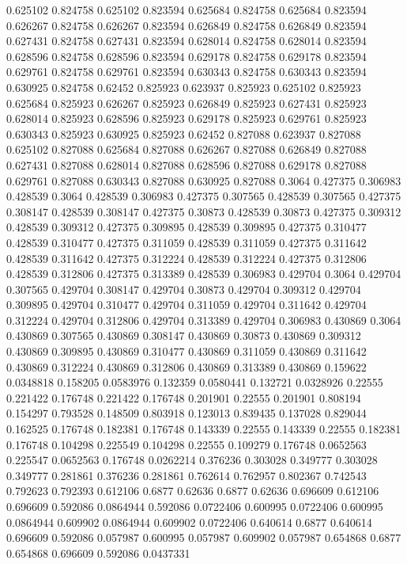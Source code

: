 0.625102 0.824758
0.625102 0.823594
0.625684 0.824758
0.625684 0.823594
0.626267 0.824758
0.626267 0.823594
0.626849 0.824758
0.626849 0.823594
0.627431 0.824758
0.627431 0.823594
0.628014 0.824758
0.628014 0.823594
0.628596 0.824758
0.628596 0.823594
0.629178 0.824758
0.629178 0.823594
0.629761 0.824758
0.629761 0.823594
0.630343 0.824758
0.630343 0.823594
0.630925 0.824758
0.62452 0.825923
0.623937 0.825923
0.625102 0.825923
0.625684 0.825923
0.626267 0.825923
0.626849 0.825923
0.627431 0.825923
0.628014 0.825923
0.628596 0.825923
0.629178 0.825923
0.629761 0.825923
0.630343 0.825923
0.630925 0.825923
0.62452 0.827088
0.623937 0.827088
0.625102 0.827088
0.625684 0.827088
0.626267 0.827088
0.626849 0.827088
0.627431 0.827088
0.628014 0.827088
0.628596 0.827088
0.629178 0.827088
0.629761 0.827088
0.630343 0.827088
0.630925 0.827088
0.3064 0.427375
0.306983 0.428539
0.3064 0.428539
0.306983 0.427375
0.307565 0.428539
0.307565 0.427375
0.308147 0.428539
0.308147 0.427375
0.30873 0.428539
0.30873 0.427375
0.309312 0.428539
0.309312 0.427375
0.309895 0.428539
0.309895 0.427375
0.310477 0.428539
0.310477 0.427375
0.311059 0.428539
0.311059 0.427375
0.311642 0.428539
0.311642 0.427375
0.312224 0.428539
0.312224 0.427375
0.312806 0.428539
0.312806 0.427375
0.313389 0.428539
0.306983 0.429704
0.3064 0.429704
0.307565 0.429704
0.308147 0.429704
0.30873 0.429704
0.309312 0.429704
0.309895 0.429704
0.310477 0.429704
0.311059 0.429704
0.311642 0.429704
0.312224 0.429704
0.312806 0.429704
0.313389 0.429704
0.306983 0.430869
0.3064 0.430869
0.307565 0.430869
0.308147 0.430869
0.30873 0.430869
0.309312 0.430869
0.309895 0.430869
0.310477 0.430869
0.311059 0.430869
0.311642 0.430869
0.312224 0.430869
0.312806 0.430869
0.313389 0.430869
0.159622 0.0348818
0.158205 0.0583976
0.132359 0.0580441
0.132721 0.0328926
0.22555 0.221422
0.176748 0.221422
0.176748 0.201901
0.22555 0.201901
0.808194 0.154297
0.793528 0.148509
0.803918 0.123013
0.839435 0.137028
0.829044 0.162525
0.176748 0.182381
0.176748 0.143339
0.22555 0.143339
0.22555 0.182381
0.176748 0.104298
0.225549 0.104298
0.22555 0.109279
0.176748 0.0652563
0.225547 0.0652563
0.176748 0.0262214
0.376236 0.303028
0.349777 0.303028
0.349777 0.281861
0.376236 0.281861
0.762614 0.762957
0.802367 0.742543
0.792623 0.792393
0.612106 0.6877
0.62636 0.6877
0.62636 0.696609
0.612106 0.696609
0.592086 0.0864944
0.592086 0.0722406
0.600995 0.0722406
0.600995 0.0864944
0.609902 0.0864944
0.609902 0.0722406
0.640614 0.6877
0.640614 0.696609
0.592086 0.057987
0.600995 0.057987
0.609902 0.057987
0.654868 0.6877
0.654868 0.696609
0.592086 0.0437331
